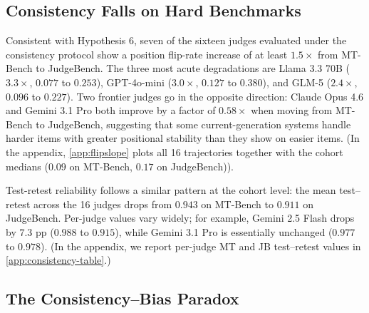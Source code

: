 \documentclass[11pt]{article}
\begin{document}
\subsection{Consistency Falls on Hard Benchmarks}


Consistent with Hypothesis 6, seven of the sixteen judges evaluated under the consistency protocol show a position flip-rate increase of at least $1.5\times$ from MT-Bench to JudgeBench. The three most acute degradations are Llama 3.3 70B ($3.3\times$, $0.077$ to $0.253$), GPT-4o-mini ($3.0\times$, $0.127$ to $0.380$), and GLM-5 ($2.4\times$, $0.096$ to $0.227$). Two frontier judges go in the opposite direction: Claude Opus 4.6 and Gemini 3.1 Pro both improve by a factor of $0.58\times$ when moving from MT-Bench to JudgeBench, suggesting that some current-generation systems handle harder items with greater positional stability than they show on easier items. (In the appendix, \autoref{app:flipslope} plots all 16 trajectories together with the cohort medians ($0.09$ on MT-Bench, $0.17$ on JudgeBench)).

Test-retest reliability follows a similar pattern at the cohort level: the mean test--retest across the 16 judges drops from $0.943$ on MT-Bench to $0.911$ on JudgeBench. Per-judge values vary widely; for example, Gemini 2.5 Flash drops by $7.3$ pp ($0.988$ to $0.915$), while Gemini 3.1 Pro is essentially unchanged ($0.977$ to $0.978$). (In the appendix, we report per-judge MT and JB test--retest values in \autoref{app:consistency-table}.)

\subsection{The Consistency--Bias Paradox}

\end{document}
